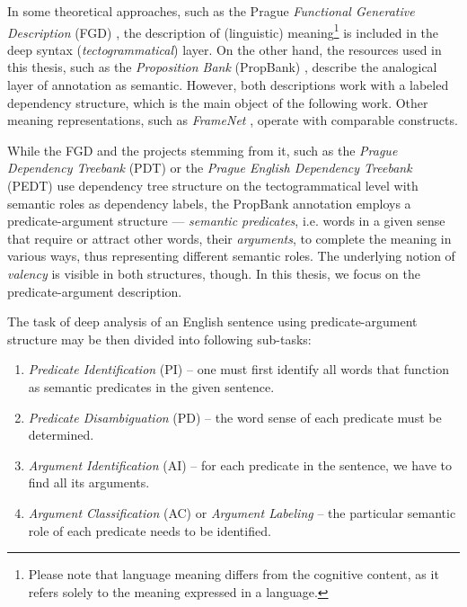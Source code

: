 \documentclass[12pt,notitlepage]{report}
\begin{document}
In some theoretical approaches, such as the Prague \emph{Functional Generative Description} (FGD) \citep{sgall86}, the description of (linguistic) meaning\footnote{Please note that language meaning differs from the cognitive content, as it refers solely to the meaning expressed in a language.} is included in the deep syntax (\emph{tectogrammatical}) layer. On the other hand, the resources used in this thesis, such as the \emph{Proposition Bank} (PropBank) \linebreak[4] \citep{palmer05}, describe the analogical layer of annotation as semantic. However, both descriptions work with a labeled dependency structure, which is the main object of the following work. Other meaning representations, such as \emph{Frame\-Net} \citep{baker98}, operate with comparable constructs.

While the FGD and the projects stemming from it, such as the \emph{Prague Dependency Treebank} (PDT) \citep{hajic06} or the \emph{Prague English Dependency Treebank} (PEDT) \citep{cinkova09} use dependency tree structure on the tectogrammatical level with semantic roles as dependency labels, the PropBank annotation \citep{kingsbury03} employs a predicate-argument structure --- \emph{semantic predicates}, i.e. words in a given sense that require or attract other words, their \emph{arguments}, to complete the meaning in various ways, thus representing different semantic roles. The underlying notion of \emph{valency} is visible in both structures, though. In this thesis, we focus on the predicate-argument description.

The task of deep analysis of an English sentence using predicate-argument structure may be then divided into following sub-tasks:
\begin{enumerate}
    \item \emph{Predicate Identification} (PI) -- one must first identify all words that function as semantic predicates in the given sentence.
    \item \emph{Predicate Disambiguation} (PD) -- the word sense of each predicate must be determined.
    \item \emph{Argument Identification}  (AI) -- for each predicate in the sentence, we have to find all its arguments.
    \item \emph{Argument Classification} (AC) or \emph{Argument Labeling} -- the particular semantic role of each predicate needs to be identified.
\end{enumerate}
\end{document}
